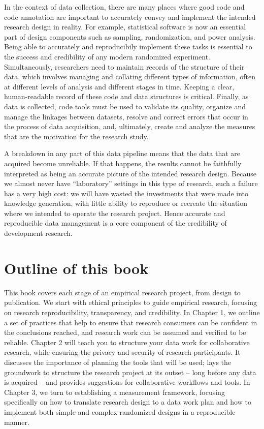 In the context of data collection, there are many places where good code and code annotation
are important to accurately convey and implement the intended research design in reality.
For example, statistical software is now an essential part of
design components such as sampling, randomization, and power analysis.
Being able to accurately and reproducibily implement these tasks
is essential to the success and credibility of any modern randomized experiment.
Simultaneously, researchers need to maintain records of the structure of their data,
which involves managing and collating different types of information,
often at different levels of analysis and different stages in time.
Keeping a clear, human-readable record of these code and data structures is critical.
Finally, as data is collected, code tools must be used to validate its quality,
organize and manage the linkages between datasets,
resolve and correct errors that occur in the process of data acquisition,
and, ultimately, create and analyze the measures that
are the motivation for the research study.

A breakdown in any part of this data pipeline
means that the data that are acquired become unreliable.
If that happens, the results cannot be faithfully interpreted
as being an accurate picture of the intended research design.
Because we almost never have ``laboratory'' settings in this type of research,
such a failure has a very high cost:
we will have wasted the investments that were made into knowledge generation,
with little ability to reproduce or recreate the situation
where we intended to operate the research project.
Hence accurate and reproducible data management is a core component
of the credibility of development research.

\section{Outline of this book}

This book covers each stage of an empirical research project, from design to publication.
We start with ethical principles to guide empirical research,
focusing on research reproducibility, transparency, and credibility.
In Chapter 1, we outline a set of practices that help to ensure that
research consumers can be confident in the conclusions reached,
and research work can be assumed and verified to be reliable.
Chapter 2 will teach you to structure your data work for collaborative research,
while ensuring the privacy and security of research participants.
It discusses the importance of planning the tools that will be used;
lays the groundwork to structure the research project at its outset --
long before any data is acquired --
and provides suggestions for collaborative workflows and tools.
In Chapter 3, we turn to establishing a measurement framework,
focusing specifically on how to translate research design to a data work plan
and how to implement both simple and complex randomized designs in a reproducible manner.

